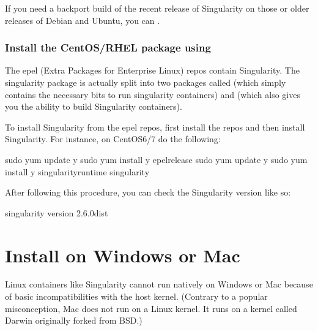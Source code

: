 \documentclass[letterpaper,10pt,english]{sphinxmanual}
\begin{document}
If you need a backport build of the recent release of Singularity on those or
older releases of Debian and Ubuntu, you can .


\subsubsection{Install the CentOS/RHEL package using }
\label{\detokenize{installation:install-the-centos-rhel-package-using-yum}}
The epel (Extra Packages for Enterprise Linux) repos contain Singularity. The
singularity package is actually split into two packages called
 (which simply contains the necessary bits to run
singularity containers) and  (which also gives you the ability to
build Singularity containers).

To install Singularity from the epel repos, first install the repos and then
install Singularity.  For instance, on CentOS6/7 do the following:

%
\begin{sphinxVerbatim}[commandchars=\\\{\}]
\PYGZdl{} sudo yum update \PYGZhy{}y \PYGZam{}\PYGZam{} \PYGZbs{}
    sudo yum install \PYGZhy{}y epel\PYGZhy{}release \PYGZam{}\PYGZam{} \PYGZbs{}
    sudo yum update \PYGZhy{}y \PYGZam{}\PYGZam{} \PYGZbs{}
    sudo yum install \PYGZhy{}y singularity\PYGZhy{}runtime singularity
\end{sphinxVerbatim}

After following this procedure, you can check the Singularity version like so:

%
\begin{sphinxVerbatim}[commandchars=\\\{\}]
\PYGZdl{} singularity \PYGZhy{}\PYGZhy{}version
    2.6.0\PYGZhy{}dist
\end{sphinxVerbatim}


\section{Install on Windows or Mac}
\label{\detokenize{installation:install-on-windows-or-mac}}
Linux containers like Singularity cannot run natively on Windows or Mac because
of basic incompatibilities with the host kernel. (Contrary to a popular
misconception, Mac does not run on a Linux kernel.  It runs on a kernel called
Darwin originally forked from BSD.)
\end{document}
